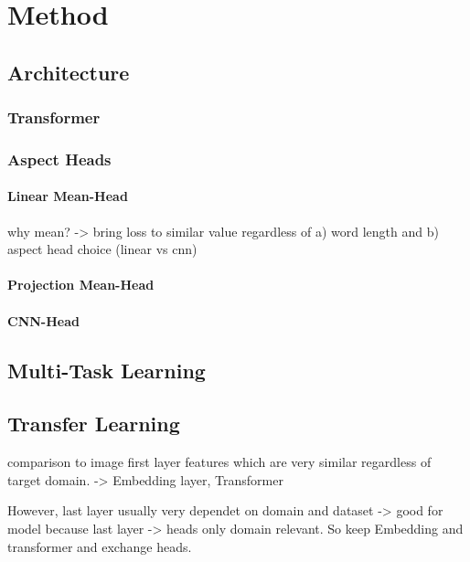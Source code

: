 \chapter{Method}
\label{ch:method}

\section{Architecture}

\subsection{Transformer}

\subsection{Aspect Heads}

\subsubsection{Linear Mean-Head}

why mean? -> bring loss to similar value regardless of a) word length and b) aspect head choice (linear vs cnn)

\subsubsection{Projection Mean-Head}

\subsubsection{CNN-Head}

\section{Multi-Task Learning}

\section{Transfer Learning}

comparison to image first layer features which are very similar regardless of target domain. \cite{Yosinski2014} -> Embedding layer, Transformer

However, last layer usually very dependet on domain and dataset -> good for model because last layer -> heads only domain relevant. So keep Embedding and transformer and exchange heads.

